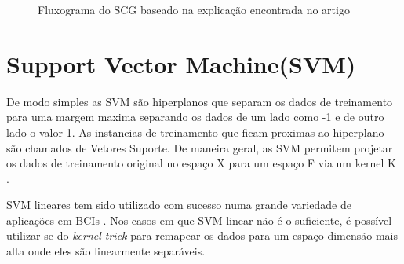 \begin{figure}[!htp]
	\begin{center}
		\caption{Fluxograma do SCG baseado na explica\c{c}\~ao encontrada no artigo \cite{MollerSCG}}
		
		\label{fig:SCG}
	\end{center}	
\end{figure}

\clearpage
\section{Support Vector Machine(SVM)}
\par
De modo simples as \ac{SVM} são hiperplanos que separam os dados de treinamento para uma margem maxima separando os dados de um lado como -1 e de outro lado o valor 1. As instancias de treinamento que ficam proximas ao hiperplano são chamados de Vetores Suporte. De maneira geral, as \ac{SVM} permitem projetar os dados de treinamento original no espaço X para um espaço F via um kernel K \cite{Haykin2008}.

\ac{SVM} lineares tem sido utilizado com sucesso numa grande variedade de aplica\c{c}\~oes em \ac{BCIs} \cite{RAO}.
Nos casos em que \ac{SVM} linear n\~ao \'e o suficiente, \'e poss\'ivel utilizar-se do \textit{kernel trick} para remapear os dados para um espa\c{c}o dimens\~ao mais alta onde eles s\~ao linearmente separ\'aveis\cite{Vapnik95}\cite{SVM2017}.
